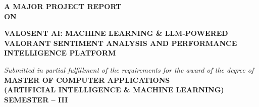 
\begin{titlepage}
\begin{center}
    \vspace*{0.2cm}
    
    {\Large \textbf{A MAJOR PROJECT REPORT}}\\[0.2cm]
    {\normalsize \textbf{ON}}\\[0.5cm]
    
    \begin{tcolorbox}[colback=krmunavy!5!white,colframe=krmunavy,arc=3mm,width=0.98\textwidth,halign=center]
        \vspace{0.2cm}
        {\LARGE \bfseries \color{krmunavy} VALOSENT AI: MACHINE LEARNING \& LLM-POWERED VALORANT SENTIMENT ANALYSIS AND PERFORMANCE INTELLIGENCE PLATFORM}
        \vspace{0.2cm}
    \end{tcolorbox}
    
    \vspace{0.6cm}
    {\normalsize \textit{Submitted in partial fulfillment of the requirements for the award of the degree of}}\\[0.3cm]
    {\large \textbf{MASTER OF COMPUTER APPLICATIONS}}\\[0.15cm]
    {\large \textbf{(ARTIFICIAL INTELLIGENCE \& MACHINE LEARNING)}}\\[0.2cm]
    {\normalsize \textbf{SEMESTER -- III}}\\[0.6cm]


\end{center}
\end{titlepage}
